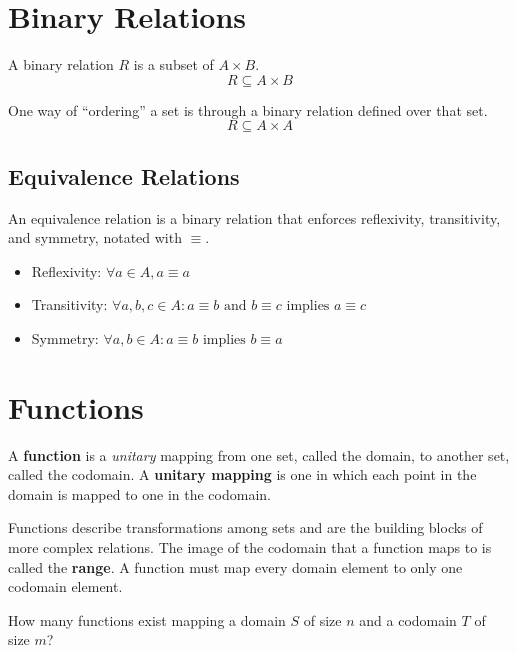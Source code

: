 \documentclass[11pt]{article}
\begin{document}
\section{Binary Relations}
	A binary relation $R$ is a subset of $A\times B$.
	\begin{equation}
		R\subseteq A\times B
	\end{equation}
	
	One way of ``ordering'' a set is through a binary relation defined over that set.
	\begin{equation}
		R\subseteq A\times A
	\end{equation}
	
	\subsection{Equivalence Relations}
		An equivalence relation is a binary relation that enforces reflexivity, transitivity, and symmetry, notated with $\equiv$.
		\begin{itemize}
			\item Reflexivity: $\forall a\in A, a\equiv a$
			\item Transitivity: $\forall a,b,c\in A:a\equiv b \text{ and } b\equiv c \text{ implies } a\equiv c$
			\item Symmetry: $\forall a,b\in A: a\equiv b \text{ implies } b\equiv a$
		\end{itemize}
		
\section{Functions}
	A \textbf{function} is a \textit{unitary} mapping from one set, called the domain, to another set, called the codomain. A \textbf{unitary mapping} is one in which each point in the domain is mapped to one in the codomain.
	
	Functions describe transformations among sets and are the building blocks of more complex relations. The image of the codomain that a function maps to is called the \textbf{range}. A function must map every domain element to only one codomain element.
	
	How many functions exist mapping a domain $S$ of size $n$ and a codomain $T$ of size $m$?

%		
%		


\end{document}
